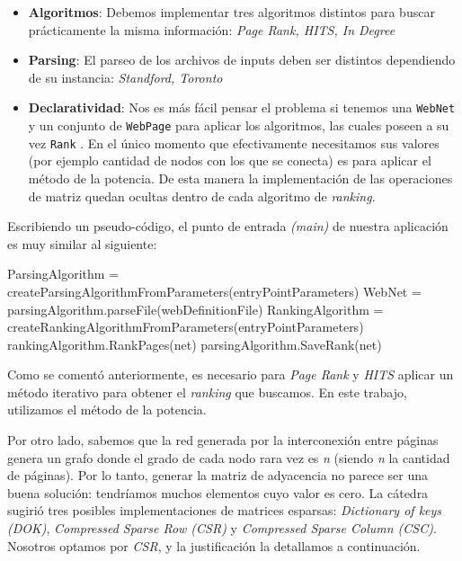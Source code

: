 	\begin{itemize}
		\item \textbf{Algoritmos}: Debemos implementar tres algoritmos distintos para buscar prácticamente la misma información: \textit{Page Rank, HITS, In Degree}
		\item \textbf{Parsing}: El parseo de los archivos de inputs deben ser distintos dependiendo de su instancia: \textit{Standford, Toronto}
		\item \textbf{Declaratividad}: Nos es más fácil pensar el problema si tenemos una \texttt{WebNet} y un conjunto de \texttt{WebPage} para aplicar los algoritmos, las cuales poseen a su vez \texttt{Rank} . En el único momento que efectivamente necesitamos sus valores (por ejemplo cantidad de nodos con los que se conecta) es para aplicar el método de la potencia. De esta manera la implementación de las operaciones de matriz quedan ocultas dentro de cada algoritmo de \textit{ranking}.
	\end{itemize}

	Escribiendo un pseudo-código, el punto de entrada \textit{(main)} de nuestra aplicación es muy similar al siguiente:

	\vspace{\baselineskip}
	\begin{codebox}
	\li ParsingAlgorithm  = createParsingAlgorithmFromParameters(entryPointParameters)
	\li WebNet  = parsingAlgorithm.parseFile(webDefinitionFile)
	\li RankingAlgorithm  = createRankingAlgorithmFromParameters(entryPointParameters)
	\li rankingAlgorithm.RankPages(net)
	\li parsingAlgorithm.SaveRank(net)
	\End
	\end{codebox} 
	\vspace{\baselineskip}

	Como se comentó anteriormente, es necesario para \textit{Page Rank} y \textit{HITS} aplicar un método iterativo para obtener el \textit{ranking} que buscamos. En este trabajo, utilizamos el método de la potencia. 

	Por otro lado, sabemos que la red generada por la interconexión entre páginas genera un grafo donde el grado de cada nodo rara vez es \textit{n} (siendo \textit{n} la cantidad de páginas). Por lo tanto, generar la matriz de adyacencia no parece ser una buena solución: tendríamos muchos elementos cuyo valor es cero. La cátedra sugirió tres posibles implementaciones de matrices esparsas: \textit{Dictionary of keys (DOK)}, \textit{Compressed Sparse Row (CSR)} y \textit{Compressed Sparse Column (CSC)}. Nosotros optamos por \textit{CSR}, y la justificación la detallamos a continuación.

